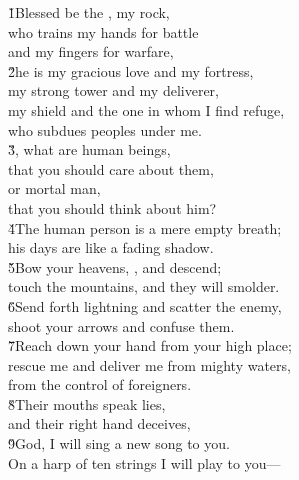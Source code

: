 \begin{poetry}
\poeml \v{1}Blessed be the , my rock, \\
\poemll    who trains my hands for battle \\
\poemlll       and my fingers for warfare, \\
\poeml \v{2}he is my gracious love and my fortress, \\
\poemll    my strong tower and my deliverer, \\
\poeml my shield and the one in whom I find refuge, \\
\poemll    who subdues peoples under me. \\
\poeml \v{3}, what are human beings, \\
\poemll    that you should care about them, \\
\poeml or mortal man, \\
\poemll    that you should think about him? \\
\poeml \v{4}The human person is a mere empty breath; \\
\poemll    his days are like a fading shadow. \\
\poeml \v{5}Bow your heavens, , and descend; \\
\poemll    touch the mountains, and they will smolder. \\
\poeml \v{6}Send forth lightning and scatter the enemy, \\
\poemll    shoot your arrows and confuse them. \\
\poeml \v{7}Reach down your hand from your high place; \\
\poemll    rescue me and deliver me from mighty waters, \\
\poemlll       from the control of foreigners. \\
\poeml \v{8}Their mouths speak lies, \\
\poemll    and their right hand deceives, \\
\poeml \v{9}God, I will sing a new song to you. \\
\poemll    On a harp of ten strings I will play to you--- \\

\end{poetry}
